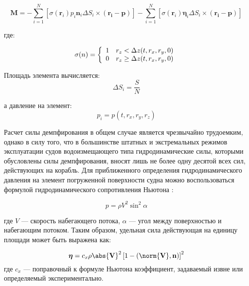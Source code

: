 \begin{equation}
	\mathbf{M} = 
		-\sum_{i=1}^{N} \left[
			\sigma (\mathbf{r}_i) p_i \mathbf{n}_i \Delta S_i \times (\mathbf{r_i} - \mathbf{p})
		\right]
		-\sum_{i=1}^{N} \left[
			\sigma (\mathbf{r}_i) \boldsymbol{\eta}_i \Delta S_i \times (\mathbf{r_i} - \mathbf{p})
		\right]
\end{equation}

где:

\begin{equation}
  \sigma(n) = \left\{
  \begin{array}{l l}
    1 & r_z		< 		\Delta z (t, r_x, r_y, 0) \\
    0 & r_z		\geq 	\Delta z (t, r_x, r_y, 0) \\
  \end{array} \right.
\end{equation}

Площадь элемента вычисляется:
\begin{equation}
	\Delta S_i = \frac{S}{N}
\end{equation}

а давление на элемент:
\begin{equation}
	p_i = p(t, r_x, r_y, r_z)
\end{equation}

Расчет силы демпфирования в общем случае является чрезвычайно трудоемким, однако в силу того, что в большинстве штатных и экстремальных режимов эксплуатации судов водоизмещающего типа гидродинамические силы, которыми обусловлены силы демпфирования, вносят лишь не более одну десятой всех сил, действующих на корабль.
Для приближенного определения гидродинамического давления на элемент погруженной поверхности судна можно воспользоваться формулой гидродинамического сопротивления Ньютона \citep{newton}:

\begin{equation}
	p = \rho V^2 \sin ^2 \alpha
\end{equation}

где $V$ --- скорость набегающего потока, $\alpha$ --- угол между поверхностью и набегающим потоком. 
Таким образом, удельная сила действующая на единицу площади может быть выражена как:

\begin{equation}
	\boldsymbol{\eta} = 
		c_x
		\rho 
		\abs{\mathbf{V}}^2 
		\left[  1 - (\norm{\mathbf{V}}, \mathbf{n})  \right]^2
\end{equation}
где $c_x$ --- поправочный к формуле Ньютона коэффициент, задаваемый извне или определяемый экспериментально.

